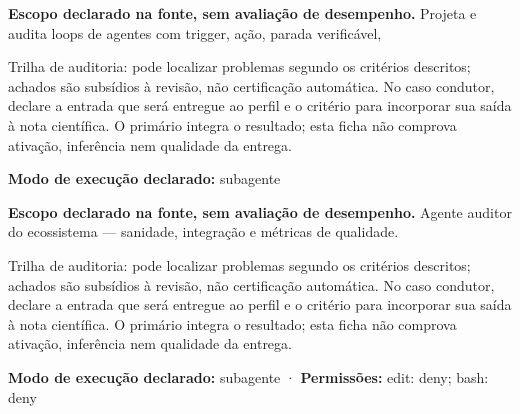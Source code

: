 
\begin{descricao}
\textbf{Escopo declarado na fonte, sem avaliação de desempenho.}
Projeta e audita loops de agentes com trigger, ação, parada verificável,
\end{descricao}

\begin{funcao}
Trilha de auditoria: pode localizar problemas segundo os critérios descritos; achados são subsídios à revisão, não certificação automática. No caso condutor, declare a entrada que será entregue ao perfil e o critério para incorporar sua saída à nota científica. O primário integra o resultado; esta ficha não comprova ativação, inferência nem qualidade da entrega.
\end{funcao}

\begin{arquitetura}
\textbf{Modo de execução declarado:} subagente
\end{arquitetura}


\begin{descricao}
\textbf{Escopo declarado na fonte, sem avaliação de desempenho.}
Agente auditor do ecossistema — sanidade, integração e métricas de qualidade.
\end{descricao}

\begin{funcao}
Trilha de auditoria: pode localizar problemas segundo os critérios descritos; achados são subsídios à revisão, não certificação automática. No caso condutor, declare a entrada que será entregue ao perfil e o critério para incorporar sua saída à nota científica. O primário integra o resultado; esta ficha não comprova ativação, inferência nem qualidade da entrega.
\end{funcao}

\begin{arquitetura}
\textbf{Modo de execução declarado:} subagente · \textbf{Permissões:} edit: deny; bash: deny
\end{arquitetura}


